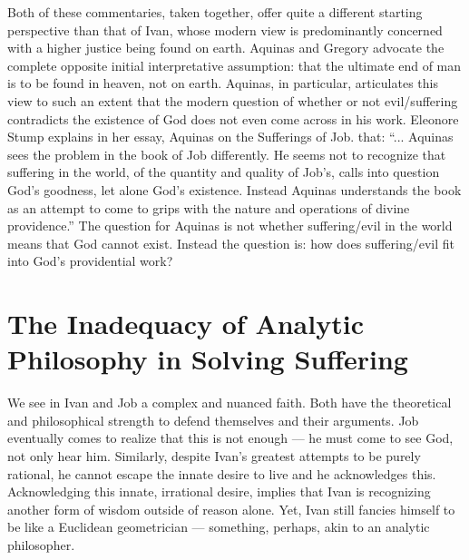 Both of these commentaries, taken together, offer quite a different starting perspective than that of Ivan, whose modern view is predominantly concerned with a higher justice being found on earth. Aquinas and Gregory advocate the complete opposite initial interpretative assumption: that the ultimate end of man is to be found in heaven, not on earth. Aquinas, in particular, articulates this view to such an extent that the modern question of whether or not evil/suffering contradicts the existence of God does not even come across in his work. Eleonore Stump explains in her essay, Aquinas on the Sufferings of Job. that: ``... Aquinas sees the problem in the book of Job differently. He seems not to recognize that suffering in the world, of the quantity and quality of Job's, calls into question God's goodness, let alone God's existence. Instead Aquinas understands the book as an attempt to come to grips with the nature and operations of divine providence.'' The question for Aquinas is not whether suffering/evil in the world means that God cannot exist. Instead the question is: how does suffering/evil fit into God's providential work? 

\section{The Inadequacy of Analytic Philosophy in Solving Suffering}
We see in Ivan and Job a complex and nuanced faith. Both have the theoretical and philosophical strength to defend themselves and their arguments. Job eventually comes to realize that this is not enough --- he must come to see God, not only hear him. Similarly, despite Ivan's greatest attempts to be purely rational, he cannot escape the innate desire to live and he acknowledges this. Acknowledging this innate, irrational desire, implies that Ivan is recognizing another form of wisdom outside of reason alone. Yet, Ivan still fancies himself to be like a Euclidean geometrician --- something, perhaps, akin to an analytic philosopher.

